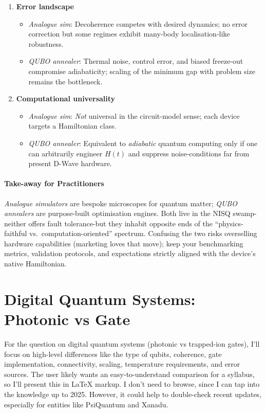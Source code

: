 \documentclass[11pt,a4paper]{article}
\begin{document}
\begin{enumerate}
	\item \textbf{Error landscape}  
	\begin{itemize}
		\item \emph{Analogue sim}: Decoherence competes with desired dynamics; no error correction but some regimes exhibit many-body localisation‐like robustness.  
		\item \emph{QUBO annealer}: Thermal noise, control error, and biased freeze-out compromise adiabaticity; scaling of the minimum gap with problem size remains the bottleneck.
	\end{itemize}
	
	\item \textbf{Computational universality}  
	\begin{itemize}
		\item \emph{Analogue sim}: \emph{Not} universal in the circuit-model sense; each device targets a Hamiltonian class.  
		\item \emph{QUBO annealer}: Equivalent to \emph{adiabatic} quantum computing only if one can arbitrarily engineer $H(t)$ and suppress noise-conditions far from present D-Wave hardware.
	\end{itemize}
\end{enumerate}

\paragraph{Take-away for Practitioners}
\emph{Analogue simulators} are bespoke microscopes for quantum matter; \emph{QUBO annealers} are purpose-built optimisation engines.  Both live in the NISQ swamp-neither offers fault tolerance-but they inhabit opposite ends of the “physics-faithful vs.\ computation-oriented” spectrum.  Confusing the two risks overselling hardware capabilities (marketing loves that move); keep your benchmarking metrics, validation protocols, and expectations strictly aligned with the device’s native Hamiltonian.

\section{Digital Quantum Systems: Photonic vs Gate}


For the question on digital quantum systems (photonic vs trapped-ion gates), I'll focus on high-level differences like the type of qubits, coherence, gate implementation, connectivity, scaling, temperature requirements, and error sources. The user likely wants an easy-to-understand comparison for a syllabus, so I'll present this in LaTeX markup. I don't need to browse, since I can tap into the knowledge up to 2025. However, it could help to double-check recent updates, especially for entities like PsiQuantum and Xanadu.
\end{document}
